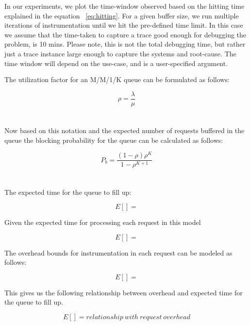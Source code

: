 In our experiments, we plot the time-window observed based on the hitting time explained in the equation ~\ref{eq:hitting}. 
For a given buffer size, we run multiple iterations of instrumentation until we hit the pre-defined time limit. 
In this case we assume that the time-taken to capture a trace good enough for debugging the problem, is 10 mins. 
Please note, this is not the total debugging time, but rather just a trace instance large enough to capture the systems and root-cause.
The time window will depend on the use-case, and is a user-specified argument.


\iffalse
The utilization factor for an M/M/1/K queue can be formulated as follows:

\begin{equation}
\rho = \frac{\lambda}{\mu}
\end{equation}
\\ \\

Now based on this notation and the expected number of requests buffered in the queue the blocking probability for the queue can be calculated as follows:

\begin{equation}
P_{b} = \frac{(1-\rho)\rho^{K}}{1-\rho^{K+1}}
\end{equation}
\\ \\

The expected time for the queue to fill up:

\begin{equation}
E[] =
\end{equation}

Given the expected time for processing each request in this model

\begin{equation}
E[] =
\end{equation}

The overhead bounds for instrumentation in each request can be modeled as follows:

\begin{equation}
E[] = 
\end{equation}

This gives us the following relationship between overhead and expected time for the queue to fill up.

\begin{equation}
E[] = relationship\ with\ request\ overhead
\end{equation}


